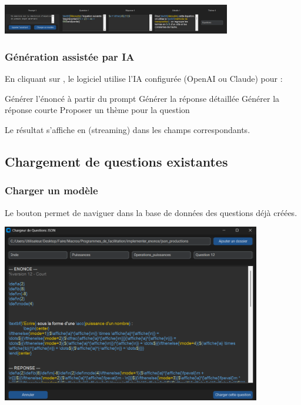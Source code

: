 \begin{center}
\includegraphics[width=0.75\textwidth]{images/UseCase_equation.png}
\end{center}

\subsubsection{Génération assistée par IA}

En cliquant sur , le logiciel utilise l'IA configurée (OpenAI ou Claude) pour :
\begin{tcbenumerate}
    \tcbitem Générer l'énoncé à partir du prompt
    \tcbitem Générer la réponse détaillée
    \tcbitem Générer la réponse courte
    \tcbitem Proposer un thème pour la question
\end{tcbenumerate}

Le résultat s'affiche en  (streaming) dans les champs correspondants.

\subsection{Chargement de questions existantes}

\subsubsection{Charger un modèle}

Le bouton  permet de naviguer dans la base de données des questions déjà créées.

\begin{center}
\includegraphics[width=0.85\textwidth]{images/UseCase_load_model.png}
\end{center}

